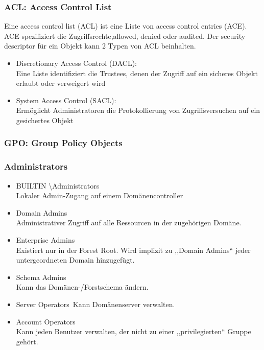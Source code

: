 \subsubsection{ACL: Access Control List}
Eine access control list (ACL) ist eine Liste von access control entries (ACE). ACE spezifiziert die Zugriffsrechte,allowed, denied oder audited. Der security descriptor für ein Objekt kann 2 Typen von ACL beinhalten.
\begin{itemize}
    \item Discretionary Access Control (DACL):\\
    Eine Liste identifiziert die Trustees, denen der Zugriff auf ein sicheres Objekt erlaubt oder verweigert wird
    \item System Access Control (SACL):\\
    Ermöglicht Administratoren die Protokollierung von Zugriffsversuchen auf ein gesichertes Objekt
\end{itemize}

\subsubsection{GPO: Group Policy Objects}

\subsubsection{Administrators}
\begin{itemize}
    \item BUILTIN \textbackslash Administrators\\
    Lokaler Admin-Zugang auf einem Domänencontroller
    \item Domain Admins\\
    Administrativer Zugriff auf alle Ressourcen in der zugehörigen Domäne.
    \item Enterprise Admins\\
    Existiert nur in der Forest Root. Wird implizit zu ,,Domain Admins`` jeder untergeordneten Domain hinzugefügt.
    \item Schema Admins\\
    Kann das Domänen-/Forstschema ändern.
    \item Server Operators\
    Kann Domänenserver verwalten.
    \item Account Operators\\
    Kann jeden Benutzer verwalten, der nicht zu einer ,,privilegierten`` Gruppe gehört.
\end{itemize}

